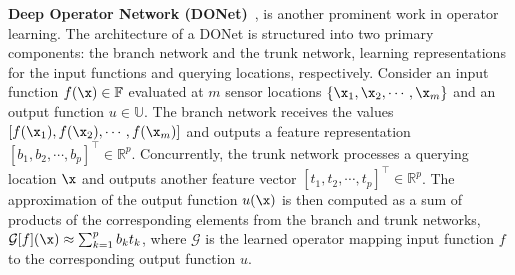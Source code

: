 \noindent\textbf{Deep Operator Network (DONet)}~\citep{lu2021learning}, is another prominent work in operator learning. %
The architecture of a DONet is  structured into two primary components: the branch network and the trunk network, learning representations for the input functions and querying locations, respectively. 
Consider an input function \(f(\x) \in \mathbb{F}\) evaluated at \(m\) sensor locations \(\{\x_1, \x_2, \cdots, \x_m\}\) and an output function \(u \in \mathbb{U}\).
The branch network receives the values \([f(\x_1), f(\x_2), \cdots, f(\x_m)]\) and outputs a feature representation \([b_1, b_2, \cdots, b_p]^\top \in \mathbb{R}^p\). Concurrently, the trunk network processes a querying location $\x$
and outputs another feature vector \([t_1, t_2, \cdots, t_p]^\top \in \mathbb{R}^p\).
The approximation of the output function \(u(\x)\) is then computed as a sum of products of the corresponding elements from the branch and trunk networks, $\mathcal{G}[f](\x) \approx \sum_{k=1}^p b_k t_k$,
where \(\mathcal{G}\) is the learned operator mapping input function \(f\) to the corresponding output function  \(u\).


